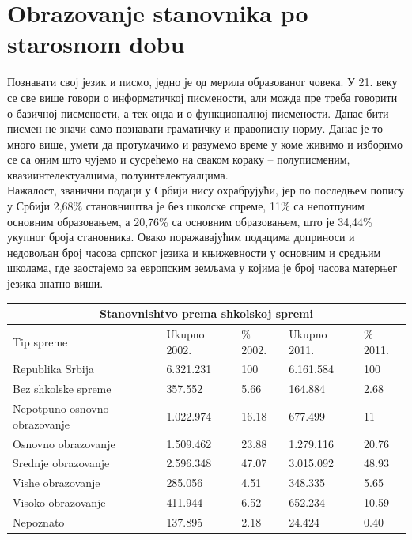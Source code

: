 \documentclass[12pt,twoside]{article}
\begin{document}
\section{Obrazovanje stanovnika po starosnom dobu}
Познавати свој језик и писмо, једно је од мерила образованог човека. У 21. веку се све више говори о информатичкој писмености, али можда пре треба говорити о базичној писмености, а тек онда и о функционалној писмености. Данас бити писмен не значи само познавати граматичку и правописну норму. Данас је то много више, умети да  протумачимо и разумемо време у коме живимо и изборимо се са оним што чујемо и сусрећемо на сваком кораку – полуписменим, квазиинтелектуалцима, полуинтелектуалцима.
\\Нажалост, званични подаци у Србији нису охрабрујући, јер по последњем попису у Србији 2,68\% становништва је без школске спреме, 11\% са непотпуним основним образовањем, а 20,76\% са основним образовањем, што је 34,44\% укупног броја становника. Овако поражавајућим подацима доприноси и недовољан број часова српског језика и књижевности у основним и средњим школама, где заостајемо за европским земљама у којима је број часова матерњег језика знатно виши.
\begin{center}
    \begin{tabular}{ |p{5cm}||p{3cm}|p{2cm}|p{3cm}|p{2cm}|  }
 \hline
 \multicolumn{5}{|c|}{Stanovnishtvo prema shkolskoj spremi} \\
 \hline
 Tip spreme & Ukupno 2002. &\% 2002.&Ukupno 2011.&\% 2011.\\
 \hline
 Republika Srbija   & 6.321.231   & 100 &   6.161.584 &   100\\
Bez shkolske spreme   & 357.552    &  5.66  &   164.884 &   2.68\\
 Nepotpuno osnovno obrazovanje   & 1.022.974    &  16.18  &   677.499 &   11\\
Osnovno obrazovanje  & 1.509.462    &  23.88  &   1.279.116 &   20.76\\
Srednje obrazovanje   & 2.596.348    &  47.07  &   3.015.092 &   48.93\\
Vishe obrazovanje  & 285.056    &  4.51  &   348.335 &   5.65\\
Visoko obrazovanje   & 411.944    &  6.52  &   652.234 &   10.59\\
 Nepoznato   & 137.895    &  2.18  &   24.424 &   0.40\\
 \hline
\end{tabular}
\end{center}
\end{document}
